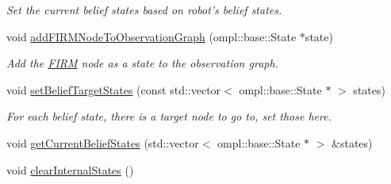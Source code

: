 \begin{DoxyCompactItemize}
\begin{DoxyCompactList}\small\item\em Set the current belief states based on robot's belief states. \end{DoxyCompactList}\item 
\hypertarget{class_n_b_m3_p_a5c7a27824bfee181b766c393740d1a10}{void \hyperlink{class_n_b_m3_p_a5c7a27824bfee181b766c393740d1a10}{add\-F\-I\-R\-M\-Node\-To\-Observation\-Graph} (ompl\-::base\-::\-State $\ast$state)}\label{class_n_b_m3_p_a5c7a27824bfee181b766c393740d1a10}

\begin{DoxyCompactList}\small\item\em Add the \hyperlink{class_f_i_r_m}{F\-I\-R\-M} node as a state to the observation graph. \end{DoxyCompactList}\item 
\hypertarget{class_n_b_m3_p_a1b5d067952fbcfc628fbe37f7fbf3438}{void \hyperlink{class_n_b_m3_p_a1b5d067952fbcfc628fbe37f7fbf3438}{set\-Belief\-Target\-States} (const std\-::vector$<$ ompl\-::base\-::\-State $\ast$ $>$ states)}\label{class_n_b_m3_p_a1b5d067952fbcfc628fbe37f7fbf3438}

\begin{DoxyCompactList}\small\item\em For each belief state, there is a target node to go to, set those here. \end{DoxyCompactList}\item 
void \hyperlink{class_n_b_m3_p_a9747b5ee488df8580a964838545b6219}{get\-Current\-Belief\-States} (std\-::vector$<$ ompl\-::base\-::\-State $\ast$ $>$ \&states)
\item 
\hypertarget{class_n_b_m3_p_ab500013db983e25a2b81fd8ee48ff428}{void \hyperlink{class_n_b_m3_p_ab500013db983e25a2b81fd8ee48ff428}{clear\-Internal\-States} ()}\label{class_n_b_m3_p_ab500013db983e25a2b81fd8ee48ff428}


\end{DoxyCompactItemize}
